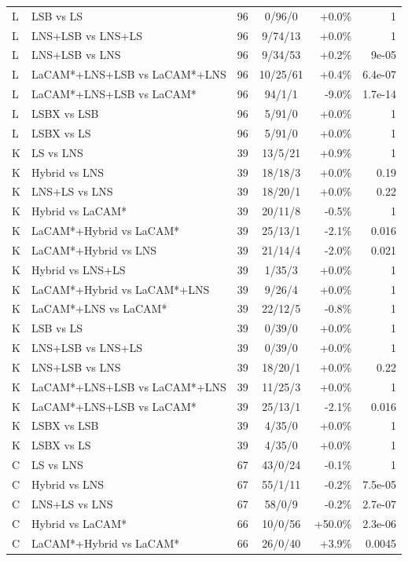 \begin{table}[t]
\begin{tabular}{llrcrr}
L & LSB vs LS & 96 & 0/96/0 & +0.0\% & 1\\
L & LNS+LSB vs LNS+LS & 96 & 9/74/13 & +0.0\% & 1\\
L & LNS+LSB vs LNS & 96 & 9/34/53 & +0.2\% & 9e-05\\
L & LaCAM*+LNS+LSB vs LaCAM*+LNS & 96 & 10/25/61 & +0.4\% & 6.4e-07\\
L & LaCAM*+LNS+LSB vs LaCAM* & 96 & 94/1/1 & -9.0\% & 1.7e-14\\
L & LSBX vs LSB & 96 & 5/91/0 & +0.0\% & 1\\
L & LSBX vs LS & 96 & 5/91/0 & +0.0\% & 1\\
K & LS vs LNS & 39 & 13/5/21 & +0.9\% & 1\\
K & Hybrid vs LNS & 39 & 18/18/3 & +0.0\% & 0.19\\
K & LNS+LS vs LNS & 39 & 18/20/1 & +0.0\% & 0.22\\
K & Hybrid vs LaCAM* & 39 & 20/11/8 & -0.5\% & 1\\
K & LaCAM*+Hybrid vs LaCAM* & 39 & 25/13/1 & -2.1\% & 0.016\\
K & LaCAM*+Hybrid vs LNS & 39 & 21/14/4 & -2.0\% & 0.021\\
K & Hybrid vs LNS+LS & 39 & 1/35/3 & +0.0\% & 1\\
K & LaCAM*+Hybrid vs LaCAM*+LNS & 39 & 9/26/4 & +0.0\% & 1\\
K & LaCAM*+LNS vs LaCAM* & 39 & 22/12/5 & -0.8\% & 1\\
K & LSB vs LS & 39 & 0/39/0 & +0.0\% & 1\\
K & LNS+LSB vs LNS+LS & 39 & 0/39/0 & +0.0\% & 1\\
K & LNS+LSB vs LNS & 39 & 18/20/1 & +0.0\% & 0.22\\
K & LaCAM*+LNS+LSB vs LaCAM*+LNS & 39 & 11/25/3 & +0.0\% & 1\\
K & LaCAM*+LNS+LSB vs LaCAM* & 39 & 25/13/1 & -2.1\% & 0.016\\
K & LSBX vs LSB & 39 & 4/35/0 & +0.0\% & 1\\
K & LSBX vs LS & 39 & 4/35/0 & +0.0\% & 1\\
C & LS vs LNS & 67 & 43/0/24 & -0.1\% & 1\\
C & Hybrid vs LNS & 67 & 55/1/11 & -0.2\% & 7.5e-05\\
C & LNS+LS vs LNS & 67 & 58/0/9 & -0.2\% & 2.7e-07\\
C & Hybrid vs LaCAM* & 66 & 10/0/56 & +50.0\% & 2.3e-06\\
C & LaCAM*+Hybrid vs LaCAM* & 66 & 26/0/40 & +3.9\% & 0.0045\\

\end{tabular}
\end{table}
